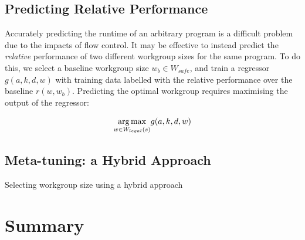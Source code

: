 \subsection{Predicting Relative Performance}

Accurately predicting the runtime of an arbitrary program is a
difficult problem due to the impacts of flow control. It may be
effective to instead predict the \emph{relative} performance of two
different workgroup sizes for the same program. To do this, we select
a baseline workgroup size $w_b \in W_{safe}$, and train a regressor
$g(a,k,d,w)$ with training data labelled with the relative performance
over the baseline $r(w, w_b)$. Predicting the optimal workgroup
requires maximising the output of the regressor:

\begin{equation}
  \underset{w \in W_{legal}(s)}{\operatorname*{arg\,max}} g(a,k,d,w)
\end{equation}

% 


\subsection{Meta-tuning: a Hybrid Approach}


\begin{algorithm}

\caption{Selecting workgroup size using a hybrid approach}
\label{alg:autotune-hybrid}
\end{algorithm}


\section{Summary}
